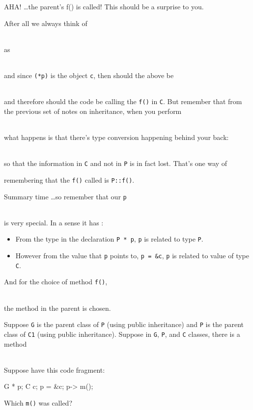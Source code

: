 AHA! \ldots the parent's f() is called! This should be a surprise to you.

After all we always think of

\\

as

\\

and since \verb!(*p)! is the object \verb!c!, then should the above be

\\

and therefore should the code be calling the \verb!f()! in \verb!C!. But remember that from the previous set of notes on inheritance, when you perform

\\

what happens is that there's type conversion happening
behind your back:

\\

so that the information in \verb!C! and not in \verb!P! is in fact lost.
That's one way of

remembering that the \verb!f()! called is \verb!P::f()!.

Summary time \ldots so remember that our \verb!p!

\\

is very special. In a sense it has :

\begin{itemize}
\item
  From the type in the declaration \verb!P * p!, \verb!p! is related to type \verb!P!.
\item
  However from the value that \verb!p! points to, \verb!p = &c!, \verb!p! is related to value of type \verb!C!.
\end{itemize}

And for the choice of method \verb!f()!,

\\

the method in the parent is chosen.

\begin{ex} Suppose \verb!G! is the parent class of \verb!P! (using public inheritance) and \verb!P! is the parent class of \verb!C1! (using public inheritance). Suppose in \verb!G!, \verb!P!, and \verb!C! classes, there is a method

\\

Suppose have this code fragment:
\begin{console}
G * p;
C c;
p = &c;
p-> m();
\end{console}
Which \texttt{m()} was called?
\end{ex}
\newpage{}

